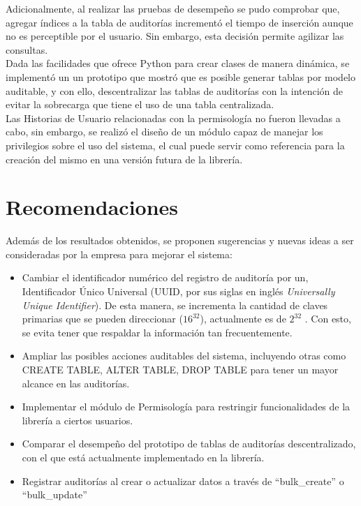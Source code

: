 Adicionalmente, al realizar las pruebas de desempeño se pudo comprobar que, agregar índices a la tabla de auditorías incrementó el tiempo de inserción aunque no es perceptible por el usuario. Sin embargo, esta decisión permite agilizar las consultas.\\

Dada las facilidades que ofrece Python para crear clases de manera dinámica, se implementó un un prototipo que mostró que es posible generar tablas por modelo auditable, y con ello, descentralizar las tablas de auditorías con la intención de evitar la sobrecarga que tiene el uso de una tabla centralizada.\\

Las Historias de Usuario relacionadas con la permisología no fueron llevadas a cabo, sin embargo, se realizó el diseño de un módulo capaz de manejar los privilegios sobre el uso del sistema, el cual puede servir como referencia para la creación del mismo en una versión futura de la librería.\\

\section*{Recomendaciones}

Además de los resultados obtenidos, se proponen sugerencias y nuevas ideas a ser consideradas por la empresa para mejorar el sistema:

\begin{itemize}
    \item Cambiar el identificador numérico del registro de auditoría por un, Identificador Único Universal (UUID, por sus siglas en inglés \textit{Universally Unique Identifier}). De esta manera, se incrementa la cantidad de claves primarias que se pueden direccionar ($16^{32}$), actualmente es de $2^{32}$ . Con esto, se evita tener que respaldar la información tan frecuentemente.
    \item Ampliar las posibles acciones auditables del sistema, incluyendo otras como CREATE TABLE, ALTER TABLE, DROP TABLE para tener un mayor alcance en las auditorías.
    \item Implementar el módulo de Permisología para restringir funcionalidades de la librería a ciertos usuarios.
    \item Comparar el desempeño del prototipo de tablas de auditorías descentralizado, con el que está actualmente implementado en la librería.
    \item Registrar auditorías al crear o actualizar datos a través de “bulk\_create” o “bulk\_update”
\end{itemize}
